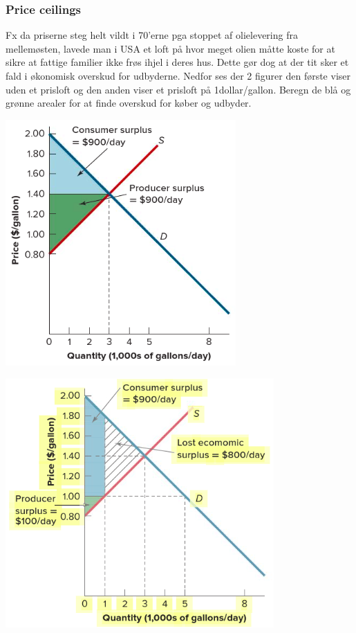 \subsubsection{Price ceilings}
Fx da priserne steg helt vildt i 70'erne pga stoppet af olielevering fra mellemøsten, lavede man i USA et loft på hvor meget olien måtte koste for at sikre at fattige familier ikke frøs ihjel i deres hus. Dette gør dog at der tit sker et fald i økonomisk overskud for udbyderne. Nedfor ses der 2 figurer den første viser uden et prisloft og den anden viser et prisloft på 1dollar/gallon. Beregn de blå og grønne arealer for at finde overskud for køber og udbyder.

\includegraphics[scale=0.5]{Afsnit/Lektion3/loft1.png}

\includegraphics[scale=0.5]{Afsnit/Lektion3/loft2.png}

